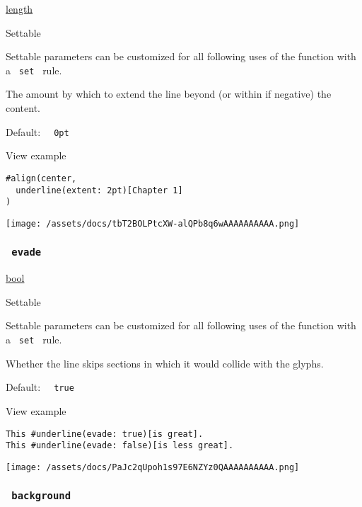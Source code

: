 \href{/docs/reference/layout/length/}{length}

{{ Settable }}

\label{parameters-extent-settable-tooltip}
Settable parameters can be customized for all following uses of the
function with a \texttt{\ set\ } rule.

The amount by which to extend the line beyond (or within if negative)
the content.

Default: \texttt{\ }{\texttt{\ 0pt\ }}\texttt{\ }


View example

\begin{verbatim}
#align(center,
  underline(extent: 2pt)[Chapter 1]
)
\end{verbatim}

\texttt{[image: /assets/docs/tbT2BOLPtcXW-alQPb8q6wAAAAAAAAAA.png]}

\subsubsection{\texorpdfstring{\texttt{\ evade\ }}{ evade }}\label{parameters-evade}

\href{/docs/reference/foundations/bool/}{bool}

{{ Settable }}

\label{parameters-evade-settable-tooltip}
Settable parameters can be customized for all following uses of the
function with a \texttt{\ set\ } rule.

Whether the line skips sections in which it would collide with the
glyphs.

Default: \texttt{\ }{\texttt{\ true\ }}\texttt{\ }


View example

\begin{verbatim}
This #underline(evade: true)[is great].
This #underline(evade: false)[is less great].
\end{verbatim}

\texttt{[image: /assets/docs/PaJc2qUpoh1s97E6NZYz0QAAAAAAAAAA.png]}

\subsubsection{\texorpdfstring{\texttt{\ background\ }}{ background }}\label{parameters-background}

